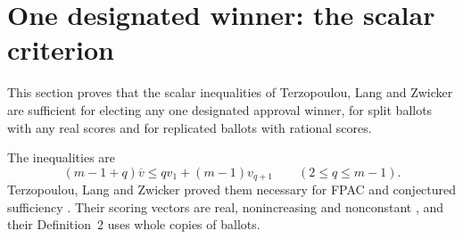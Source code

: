 \documentclass[11pt,a4paper]{article}
\theoremstyle{definition}
\theoremstyle{remark}
\begin{document}
\section{One designated winner: the scalar criterion}\label{sec:fpac}
This section proves that the scalar inequalities of Terzopoulou, Lang and Zwicker are sufficient for electing any one designated approval winner, for split ballots with any real scores and for replicated ballots with rational scores.

The inequalities are
\begin{equation}
 (m-1+q)\overline v\le qv_1+(m-1)v_{q+1}
 \qquad(2\le q\le m-1).\label{scalar}
\end{equation}
Terzopoulou, Lang and Zwicker proved them necessary for FPAC and conjectured sufficiency \cite[Lemma~2 and note~9]{tlz}. Their scoring vectors are real, nonincreasing and nonconstant \cite[Sect.~2.1]{tlz}, and their Definition~2 uses whole copies of ballots.
\end{document}
